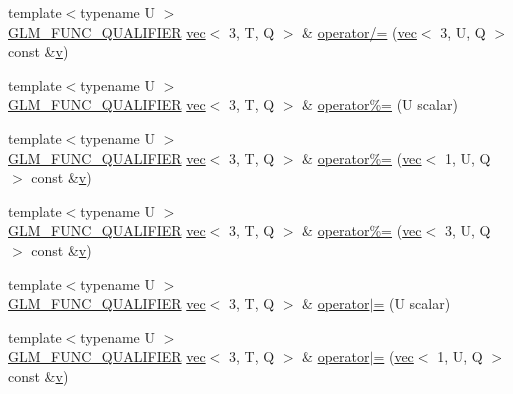 \begin{DoxyCompactItemize}
\item 
{\footnotesize template$<$typename U $>$ }\\\hyperlink{setup_8hpp_a33fdea6f91c5f834105f7415e2a64407}{G\+L\+M\+\_\+\+F\+U\+N\+C\+\_\+\+Q\+U\+A\+L\+I\+F\+I\+ER} \hyperlink{structglm_1_1vec}{vec}$<$ 3, T, Q $>$ \& \hyperlink{structglm_1_1vec_3_013_00_01_t_00_01_q_01_4_ace726247678030918d73ae2206dcacbe}{operator/=} (\hyperlink{structglm_1_1vec}{vec}$<$ 3, U, Q $>$ const \&\hyperlink{_s_d_l__opengl_8h_a10a82eabcb59d2fcd74acee063775f90}{v})
\item 
{\footnotesize template$<$typename U $>$ }\\\hyperlink{setup_8hpp_a33fdea6f91c5f834105f7415e2a64407}{G\+L\+M\+\_\+\+F\+U\+N\+C\+\_\+\+Q\+U\+A\+L\+I\+F\+I\+ER} \hyperlink{structglm_1_1vec}{vec}$<$ 3, T, Q $>$ \& \hyperlink{structglm_1_1vec_3_013_00_01_t_00_01_q_01_4_a4b64d60016fdc6a48a5003aa67e9de29}{operator\%=} (U scalar)
\item 
{\footnotesize template$<$typename U $>$ }\\\hyperlink{setup_8hpp_a33fdea6f91c5f834105f7415e2a64407}{G\+L\+M\+\_\+\+F\+U\+N\+C\+\_\+\+Q\+U\+A\+L\+I\+F\+I\+ER} \hyperlink{structglm_1_1vec}{vec}$<$ 3, T, Q $>$ \& \hyperlink{structglm_1_1vec_3_013_00_01_t_00_01_q_01_4_af436942fa5f5b2329bede870f539a223}{operator\%=} (\hyperlink{structglm_1_1vec}{vec}$<$ 1, U, Q $>$ const \&\hyperlink{_s_d_l__opengl_8h_a10a82eabcb59d2fcd74acee063775f90}{v})
\item 
{\footnotesize template$<$typename U $>$ }\\\hyperlink{setup_8hpp_a33fdea6f91c5f834105f7415e2a64407}{G\+L\+M\+\_\+\+F\+U\+N\+C\+\_\+\+Q\+U\+A\+L\+I\+F\+I\+ER} \hyperlink{structglm_1_1vec}{vec}$<$ 3, T, Q $>$ \& \hyperlink{structglm_1_1vec_3_013_00_01_t_00_01_q_01_4_ae6a625383036d5b89748613801ad94e6}{operator\%=} (\hyperlink{structglm_1_1vec}{vec}$<$ 3, U, Q $>$ const \&\hyperlink{_s_d_l__opengl_8h_a10a82eabcb59d2fcd74acee063775f90}{v})
\item 
{\footnotesize template$<$typename U $>$ }\\\hyperlink{setup_8hpp_a33fdea6f91c5f834105f7415e2a64407}{G\+L\+M\+\_\+\+F\+U\+N\+C\+\_\+\+Q\+U\+A\+L\+I\+F\+I\+ER} \hyperlink{structglm_1_1vec}{vec}$<$ 3, T, Q $>$ \& \hyperlink{structglm_1_1vec_3_013_00_01_t_00_01_q_01_4_a5c8e5e0dd0ca430f5e2a7d346d31f809}{operator$\vert$=} (U scalar)
\item 
{\footnotesize template$<$typename U $>$ }\\\hyperlink{setup_8hpp_a33fdea6f91c5f834105f7415e2a64407}{G\+L\+M\+\_\+\+F\+U\+N\+C\+\_\+\+Q\+U\+A\+L\+I\+F\+I\+ER} \hyperlink{structglm_1_1vec}{vec}$<$ 3, T, Q $>$ \& \hyperlink{structglm_1_1vec_3_013_00_01_t_00_01_q_01_4_a989756f0f4b1dfb7c3b6e07f30cbd790}{operator$\vert$=} (\hyperlink{structglm_1_1vec}{vec}$<$ 1, U, Q $>$ const \&\hyperlink{_s_d_l__opengl_8h_a10a82eabcb59d2fcd74acee063775f90}{v})

\end{DoxyCompactItemize}
